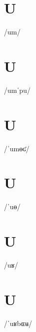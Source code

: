 \documentclass[10pt,a4paper,twoside]{book}
\begin{document}
\section*{U}

\begin{multicols}{3}
 {/um/} {}
\end{multicols}

\section*{U}

\begin{multicols}{3}
 {/umˈpu/} {}
\end{multicols}

\section*{U}

\begin{multicols}{3}
 {/ˈumɵʛ/} {}
\end{multicols}

\section*{U}

\begin{multicols}{3}
 {/ˈuɵ/} {}
\end{multicols}

\section*{U}

\begin{multicols}{3}
 {/uʁ/} {}
\end{multicols}

\section*{U}

\begin{multicols}{3}
 {/ˈuʁbɶʉ/} {}
\end{multicols}
\end{document}

